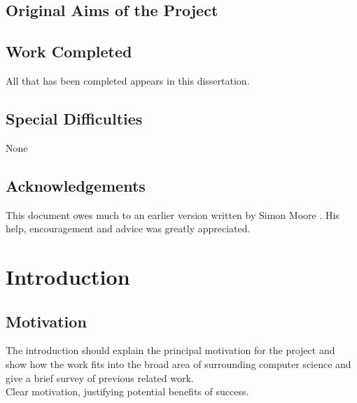\documentclass[12pt,a4paper,twoside,openright]{report}
\begin{document}


\section*{Original Aims of the Project}



\section*{Work Completed}

All that has been completed appears in this dissertation.

\section*{Special Difficulties}

None

\newpage

\tableofcontents

\listoffigures

\newpage
\section*{Acknowledgements}

This document owes much to an earlier version written by Simon Moore
\cite{Moore95}.  His help, encouragement and advice was greatly 
appreciated.


\pagestyle{headings}

\chapter{Introduction}

\section{Motivation}
The introduction should explain the principal motivation for the project and show how the work fits into the broad area of surrounding computer science and give a brief survey of previous related work. \\
Clear motivation, justifying potential benefits of success.
\end{document}
